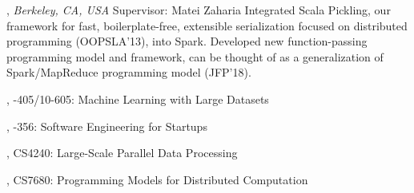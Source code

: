 \documentclass[9pt]{article}
\begin{document}
, \emph{Berkeley, CA, USA} \vspace{0.01in} 
\newline{}
\newline\noindent Supervisor: Matei Zaharia
\newline\noindent Integrated Scala Pickling, our framework for fast, boilerplate-free, extensible
\newline\noindent serialization focused on distributed programming (OOPSLA'13), into Spark.
\newline\noindent Developed new function-passing programming model and framework, can be
\newline\noindent thought of as a generalization of Spark/MapReduce programming model (JFP'18).

\bigskip

\medskip
{}

,  
\newline{}-405/10-605: Machine Learning with Large Datasets 
\bigskip


,  
\newline{}-356: Software Engineering for Startups 
\bigskip

,  
\newline\noindent CS4240: Large-Scale Parallel Data Processing 
\bigskip

, 
\newline\noindent CS7680: Programming Models for Distributed Computation 
\bigskip
\end{document}
